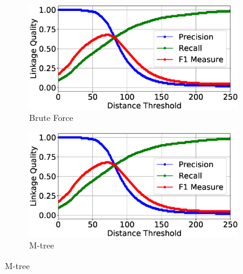\documentclass{llncs}
\begin{document}
\begin{figure}
\centering
\begin{subfigure}{.5\textwidth}
  \centering
\includegraphics[width=\textwidth]{figures/plotLQ-cora-brute}
\vspace{-6mm}
\caption{Brute Force}
\end{subfigure}%
\begin{subfigure}{.5\textwidth}
  \centering
\includegraphics[width=\textwidth]{figures/plotLQ-cora-mtree}
\vspace{-6mm}
\caption{M-tree}
\end{subfigure} \vspace{5mm}


\end{figure}
\end{document}

